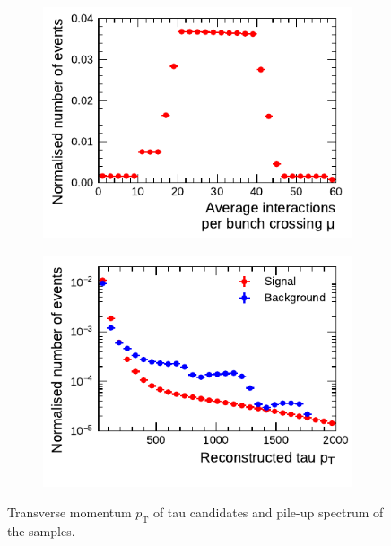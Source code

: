 \begin{figure}[htb]
  \centering
  \begin{subfigure}[t]{0.48\textwidth}
    \centering
    \includegraphics{./figures/bdt_perf/pt_mu_samples/mu.pdf}
  \end{subfigure}\hfill
  \begin{subfigure}[t]{0.48\textwidth}
    \centering
    \includegraphics{./figures/bdt_perf/pt_mu_samples/pt.pdf}
  \end{subfigure}
  \caption{Transverse momentum $p_\text{T}$ of tau candidates and pile-up
    spectrum of the samples.}
  \label{fig:pt_mu}
\end{figure}

